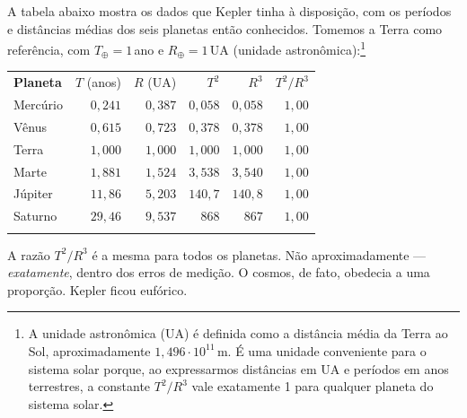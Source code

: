 A tabela abaixo mostra os dados que Kepler tinha à disposição, com os períodos e
distâncias médias dos seis planetas então conhecidos. Tomemos a Terra como referência,
com $T_\oplus = 1$\,ano e $R_\oplus = 1$\,UA (unidade astronômica):\footnote{A unidade
astronômica (UA) é definida como a distância média da Terra ao Sol, aproximadamente
$1{,}496 \cdot 10^{11}$\,m. É uma unidade conveniente para o sistema solar porque, ao
expressarmos distâncias em UA e períodos em anos terrestres, a constante $T^2/R^3$ vale
exatamente 1 para qualquer planeta do sistema solar.}
 


\vspace{0.8em}
\begin{center}
\setlength{\tabcolsep}{1.4em}
\renewcommand{\arraystretch}{1.45}
\setlength{\arrayrulewidth}{0.35pt}   %
\begin{tabular}{@{\hspace{0.6em}}lrrrrr@{\hspace{0.6em}}}
  \hline
  \noalign{\vspace{2pt}}
  \textbf{Planeta} & $T$ (anos) & $R$ (UA) & $T^2$ & $R^3$ & $T^2/R^3$ \\
  \noalign{\vspace{2pt}}
  \hline
  \noalign{\vspace{1pt}}
  Mercúrio & $0{,}241$ & $0{,}387$ & $0{,}058$ & $0{,}058$ & $1{,}00$ \\ \hline
  Vênus    & $0{,}615$ & $0{,}723$ & $0{,}378$ & $0{,}378$ & $1{,}00$ \\ \hline
  Terra    & $1{,}000$ & $1{,}000$ & $1{,}000$ & $1{,}000$ & $1{,}00$ \\ \hline
  Marte    & $1{,}881$ & $1{,}524$ & $3{,}538$ & $3{,}540$ & $1{,}00$ \\ \hline
  Júpiter  & $11{,}86$ & $5{,}203$ & $140{,}7$ & $140{,}8$ & $1{,}00$ \\ \hline
  Saturno  & $29{,}46$ & $9{,}537$ & $868$     & $867$     & $1{,}00$ \\
  \noalign{\vspace{1pt}}
  \hline
\end{tabular}
\end{center}
\vspace{0.8em}



 
A razão $T^2/R^3$ é a mesma para todos os planetas. Não aproximadamente --- \textit{exatamente},
dentro dos erros de medição. O cosmos, de fato, obedecia a uma proporção. Kepler ficou
eufórico.
 
